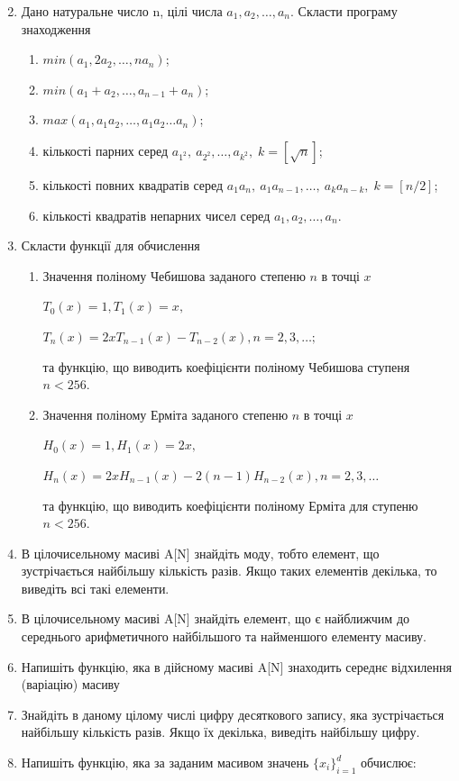 \documentclass[a5paper,titlepage,openany,twoside,draft]{book_unv}%
\makeatletter
\newcommand{\xslalph}[1]{\expandafter\@xslalph\csname c@#1\endcsname}
\newcommand{\@xslalph}[1]{%
    \ifcase#1\or а\or б\or в\or г\or д\or e\or є\or ж\or з\or i%
    \or й\or к\or л\or м\or н\or о\or п\or р\or с\or т%
    \or у\or ф\or х\or ц\or ч\or ш\or ю\or я\or аа\or бб\or вв%
    \else\@ctrerr\fi%
}
\makeatother
\begin{document}
\begin{enumerate}
\begin{multicols}{2}
\begin{enumerate}[label=\xslalph*)]
\end{enumerate}
 \end{multicols}

\item Дано натуральне число n, цілі числа \(a_{1},a_{2},\ldots,a_{n}\).
Скласти програму знаходження
  \begin{multicols}{2}
\begin{enumerate}[label=\xslalph*)]
\item
 \(min(a_{1},2a_{2},\ldots,na_{n})\);
\item \(min(a_{1} + a_{2},\ldots,a_{n - 1} + a_{n})\);
\item \(max(a_{1},a_{1}a_{2},\ldots,a_{1}a_{2}\ldots a_{n})\);
\item кількості парних серед \(a_{1^2},\ a_{2^2},\ldots,a_{k^2},\; k=[\sqrt{n}] \);
\item кількості повних квадратів серед \(a_{1}a_{n},\ a_{1}a_{n-1},\ldots,\ a_{k}a_{n-k},\; k=[n/2]\);
\item кількості квадратів непарних чисел серед
\(a_{1},a_{2},\ldots,a_{n}\).
\end{enumerate}
\end{multicols}

\item
Скласти функції для обчислення
\begin{enumerate}[label=\xslalph*)]
\item
Значення поліному Чебишова заданого степеню \(n\) в точці \(x\)

\(T_{0}(x) = 1,T_{1}(x) = x,\)

\(T_{n}(x) = 2xT_{n - 1}(x) - T_{n - 2}(x),n = 2,3,\ldots;\)

та функцію, що виводить коефіцієнти поліному Чебишова ступеня $n<256$.

\item
Значення поліному Ерміта заданого степеню \(n\) в точці \(x\)

\(H_{0}(x) = 1,H_{1}(x) = 2x,\)

\(H_{n}(x) = 2xH_{n - 1}(x) - 2(n - 1)H_{n - 2}(x),n = 2,3,\ldots\)

та функцію, що виводить коефіцієнти поліному Ерміта для ступеню $n<256$.
\end{enumerate}
\item
  В цілочисельному масиві A{[}N{]} знайдіть моду, тобто елемент, що
  зустрічається найбільшу кількість разів. Якщо таких елементів декілька,
  то виведіть всі такі елементи.

\item
  В цілочисельному масиві A{[}N{]} знайдіть елемент, що є найближчим до
  середнього арифметичного найбільшого та найменшого елементу масиву.
\item
  Напишіть функцію, яка в дійсному масиві A{[}N{]} знаходить середнє
  відхилення (варіацію) масиву
\item
  Знайдіть в даному цілому числі цифру десяткового запису, яка
  зустрічається найбільшу кількість разів. Якщо їх декілька, виведіть
  найбільшу цифру.
\item
  Напишіть функцію, яка за заданим масивом значень
  \({\{ x_{i}\}}_{i = 1}^{d}\) обчислює:


\end{enumerate}
\end{document}
